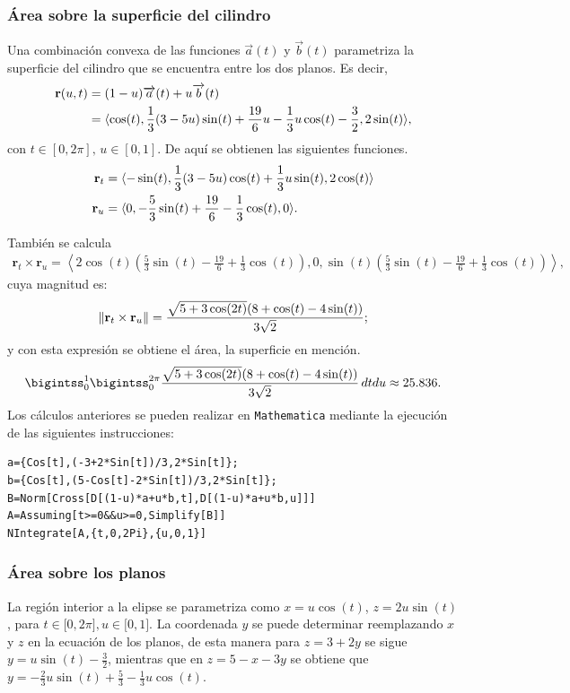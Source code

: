 \subsubsection{Área sobre la superficie del cilindro}
Una combinación convexa de las funciones
$\overrightarrow{a}(t)$ y $\overrightarrow{b}(t)$ parametriza la superficie del cilindro que se encuentra entre los dos planos. Es decir,
\begin{align*}
{\bf r}(u,t) &= ( 1-u) \overrightarrow{a}(t)+u\overrightarrow{b}(t) \\
&= \langle \cos (t),\frac{1}{3}( 3-5u)\sin (t) +\frac{19}{6}u-\frac{1}{3}u\cos (t)-\frac{3}{2},2\sin (t)\rangle,
\end{align*}
con $t\in [0,2\pi],\,u\in [0,1]$.
De aquí se obtienen las siguientes funciones.
\begin{align*}
{\bf r}_{t}&= \langle -\sin(t),\frac{1}{3}(3-5u)\cos(t)+\frac{1}{3}u\sin(t),2\cos(t)\rangle \\
{\bf r}_{u}&= \langle 0,-\frac{5}{3}\sin(t)+\frac{19}{6}-\frac{1}{3}\cos(t),0\rangle.
\end{align*}

También se calcula
\begin{gather*}
\mathbf{r}_{t}\times\mathbf{r}_{u}= \left \langle2\cos(t)\left (\frac{5}{3}\sin(t)-\frac{19}{6}+\frac{1}{3}\cos(t)\right),0,\sin(t)\left (\frac{5}{3}\sin(t)-\frac{19}{6}+\frac{1}{3}\cos(t)\right) \right \rangle,
\end{gather*}
cuya magnitud es:
\[\|{\bf r}_{t}\times{\bf r}_{u}\|=\frac{\sqrt{5+3\cos(2t)}(8+\cos(t)-4\sin (t))}{3\sqrt{2}};\]
y con esta expresión se obtiene el área, la superficie en mención.
\[\bigintss_{0}^{1}\bigintss_{0}^{2\pi}\frac{\sqrt{5+3\cos(2t)}(8+\cos(t)-4\sin(t))}{3\sqrt{2}} \, dtdu \approx 25.836.\]
Los cálculos anteriores se pueden realizar en \verb"Mathematica"
mediante la ejecución de las siguientes instrucciones:

\begin{tcolorbox}[title=\bf Instrucción en \verb"Mathematica"]
\begin{Verbatim}[formatcom=\letraverbatim]
a={Cos[t],(-3+2*Sin[t])/3,2*Sin[t]};
b={Cos[t],(5-Cos[t]-2*Sin[t])/3,2*Sin[t]};
B=Norm[Cross[D[(1-u)*a+u*b,t],D[(1-u)*a+u*b,u]]]
A=Assuming[t>=0&&u>=0,Simplify[B]]
NIntegrate[A,{t,0,2Pi},{u,0,1}]
\end{Verbatim}
\end{tcolorbox}

\subsubsection{Área sobre los planos}
La región interior a la elipse se parametriza como
$x=u\cos(t)$, $z=2u\sin (t)$, para $t\in \lbrack 0,2\pi ],u\in \lbrack 0,1]$.
La coordenada $y$ se puede determinar reemplazando $x$ y $z$ en la ecuación de los planos, de esta manera para  $z=3+2y$ se sigue $y=u\sin (t)-\frac{3}{2}$,
mientras que en $z=5-x-3y$ se obtiene que
$y=-\frac{2}{3}u\sin (t)+\frac{5}{3}-\frac{1}{3}u\cos (t)$.

